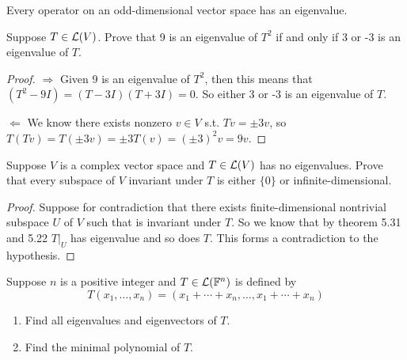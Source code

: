 \documentclass{extarticle}
\begin{document}
\begin{thm}
    Every operator on an odd-dimensional vector space has an eigenvalue. 
\end{thm}


\newpage 
{}

\begin{problem}{1}
    Suppose \(T \in \mathcal{L}(V)\). Prove that 9 is an eigenvalue of \(T^2\) if and only if 3 or -3 is an eigenvalue 
    of \(T\). 
\end{problem}

\begin{proof}
\(\Rightarrow\) Given 9 is an eigenvalue of \(T^2\), then this means that \((T^2 - 9I) = (T - 3I)(T+3I) = 0\). 
So either 3 or -3 is an eigenvalue of \(T\). 

\(\Leftarrow\) We know there exists nonzero \(v \in V\) s.t. \(Tv = \pm 3v\), so \(T(Tv) = T( \pm 3v) 
= \pm 3 T(v) = (\pm 3)^2 v = 9v\).
\end{proof}

\begin{problem}{2}
    Suppose \(V\) is a complex vector space and \(T \in \mathcal{L}(V)\) has no eigenvalues. Prove that every subspace 
    of \(V\) invariant under \(T\) is either \(\{0\}\) or infinite-dimensional. 
\end{problem}

\begin{proof}
Suppose for contradiction that there exists finite-dimensional nontrivial subspace \(U\) of \(V\) such that is invariant 
under \(T\). So we know that by theorem 5.31 and 5.22 \(T|_U\) has eigenvalue and so does \(T\). This forms a contradiction 
to the hypothesis.
\end{proof}

\begin{problem}{3}
    Suppose \(n\) is a positive integer and \(T \in \mathcal{L}(\mathbb{F}^n)\) is defined by 
    \[T(x_1, \ldots, x_n) = (x_1 + \cdots + x_n, \ldots, x_1 + \cdots + x_n)\]
    \begin{enumerate}[label=(\alph*)]
        \item Find all eigenvalues and eigenvectors of \(T\). 
        \item Find the minimal polynomial of \(T\).
    \end{enumerate}
\end{problem}
\end{document}
